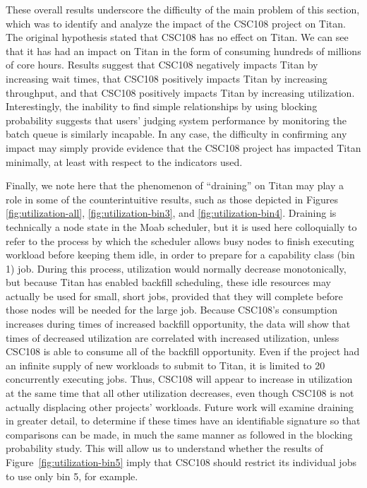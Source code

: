 These overall results underscore the difficulty of the main problem of this
section, which was to identify and analyze the impact of the CSC108 project on
Titan. The original hypothesis stated that CSC108 has no effect on Titan. We
can see that it has had an impact on Titan in the form of consuming hundreds of
millions of core hours. Results suggest that CSC108 negatively impacts Titan by
increasing wait times, that CSC108 positively impacts Titan by increasing
throughput, and that CSC108 positively impacts Titan by increasing utilization.
Interestingly, the inability to find simple relationships by using blocking
probability suggests that users' judging system performance by monitoring the
batch queue is similarly incapable. In any case, the difficulty in confirming
any impact may simply provide evidence that the CSC108 project has impacted
Titan minimally, at least with respect to the indicators used.

Finally, we note here that the phenomenon of ``draining'' on Titan may play a
role in some of the counterintuitive results, such as those depicted in Figures
\ref{fig:utilization-all}, \ref{fig:utilization-bin3}, and
\ref{fig:utilization-bin4}. Draining is technically a node state in the Moab
scheduler, but it is used here colloquially to refer to the process by which
the scheduler allows busy nodes to finish executing workload before keeping
them idle, in order to prepare for a capability class (bin 1) job. During this
process, utilization would normally decrease monotonically, but because Titan
has enabled backfill scheduling, these idle resources may actually be used for
small, short jobs, provided that they will complete before those nodes will be
needed for the large job. Because CSC108's consumption increases during times
of increased backfill opportunity, the data will show that times of decreased
utilization are correlated with increased utilization, unless CSC108 is able to
consume all of the backfill opportunity. Even if the project had an infinite
supply of new workloads to submit to Titan, it is limited to 20 concurrently
executing jobs. Thus, CSC108 will appear to increase in utilization at the
same time that all other utilization decreases, even though CSC108 is not
actually displacing other projects' workloads. Future work will examine
draining in greater detail, to determine if these times have an identifiable
signature so that comparisons can be made, in much the same manner as followed
in the blocking probability study. This will allow us to understand whether
the results of Figure~\ref{fig:utilization-bin5} imply that CSC108 should
restrict its individual jobs to use only bin 5, for example.



